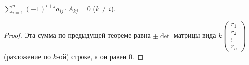 \begin{consequence}
    $\sum_{i=1}^n (-1)^{i+j} a_{ij} \cdot A_{kj} = 0$ ($k \neq i$).
\end{consequence}
\begin{proof}
    Эта сумма по предыдущей теореме равна $\pm \det$ матрицы вида  $k \begin{pmatrix} r_1 \\ r_2 \\ \vdots \\ r_n \end{pmatrix}$ (разложение по $k$-ой) строке, а он равен 0.
\end{proof}
